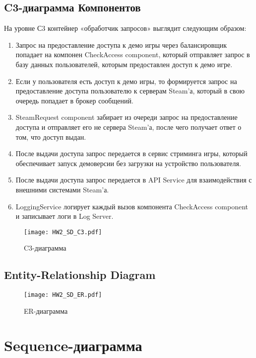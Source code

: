 \documentclass[12pt, a4paper]{article}
\begin{document}
\subsection{C3-диаграмма Компонентов}
На уровне С3 контейнер «обработчик запросов» 
выглядит следующим образом:
\begin{enumerate}
	\item Запрос на предоставление доступа к демо 
	игры через балансировщик попадает на компонен 
	CheckAccess component, который отправляет запрос 
	в базу данных пользователей, которым 
	предоставлен доступ к демо игре.
	\item Если у пользователя есть доступ к демо 
	игры, то формируется запрос на предоставление 
	доступа пользователю к серверам Steam’а, который 
	в свою очередь попадает в брокер сообщений.
	\item SteamRequest component забирает из очереди 
	запрос на предоставление доступа и отправляет 
	его не сервера Steam’а, после чего получает 
	ответ о том, что доступ выдан.
	\item После выдачи доступа запрос передается в 
	сервис стриминга игры, который обеспечивает 
	запуск демоверсии без загрузки на устройство 
	пользователя.
	\item После выдачи доступа запрос передается в 
	API Service для взаимодействия с внешними 
	системами Steam’а.
	\item LoggingService логирует каждый вызов 
	компонента CheckAccess component и записывает 
	логи в Log Server.
\end{enumerate}


\begin{figure}[htbp]
    \centering
    \texttt{[image: HW2\_SD\_C3.pdf]} 
    \caption{C3-диаграмма}
    \label{fig:C3}
\end{figure}
\newpage

\subsection{Entity-Relationship Diagram}
\begin{figure}[htbp]
    \centering
    \texttt{[image: HW2\_SD\_ER.pdf]} 
    \caption{ER-диаграмма}
    \label{fig:ER}
\end{figure}
\newpage
\section{Sequence-диаграмма}
\end{document}
